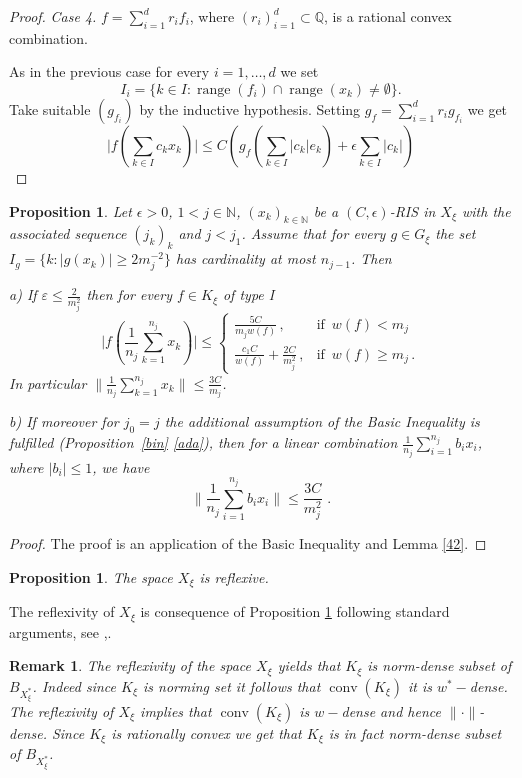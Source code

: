 \documentclass[a4paper]{amsart}
\theoremstyle{plain}
\newtheorem{proposition}[theorem]{Proposition}
\newtheorem{remark}[theorem]{Remark}
\newcommand{\N}{\mathbb{N}}
\newcommand{\Q}{\mathbb{Q}}
\newcommand{\e}{\epsilon}
\newcommand{\norm}[1][\cdot]{\lVert #1\rVert}
\DeclareMathOperator{\conv}{conv}
\DeclareMathOperator{\ran}{range}
\begin{document}
\begin{proof}
\textit{Case 4.} $f=\sum_{i=1}^dr_{i}f_{i}$, where $(r_{i})_{i=1}^d\subset\Q$, is a
rational convex combination.

As in the previous case for every $i=1,\dots,d$ we set
$$I_{i}=\{k\in I: \ran(f_{i})\cap\ran(x_k)\ne\emptyset\}.
$$
Take suitable $(g_{f_i})$ by the inductive hypothesis. Setting $g_{f}=\sum_{i=1}^{d}r_{i}g_{f_i}$ we get
$$
\vert f(\sum_{k\in I}c_{k}x_{k})\vert \leq  C(g_{f}(\sum_{k\in I}\vert c_{k}\vert e_{k})+\e\sum_{k\in I}\vert c_k\vert)
$$
\end{proof}
\begin{proposition}\label{ris}
Let $\e>0$, $1<j\in\N$, $(x_{k})_{k\in\N}$ be a $(C,\e)$-RIS in  $X_{\xi}$  with the associated sequence $(j_{k})_{k}$ and  $j<j_{1}$.
 Assume that for   every $g\in G_{\xi}$ the set
$I_{g}=\{k:\vert g(x_k)\vert\geq 2m_{j}^{-2}\}$
has cardinality at most $n_{j-1}$.
Then

a) If $\varepsilon\leq\frac{2}{m_{j}^{2}}$ then for every $f\in K_{\xi}$ of type I
$$
\vert f(\frac{1}{n_{j}}\sum_{k=1}^{n_{j}}x_{k})\vert \leq
\begin{cases}
\frac{5C}{m_{j}w(f)}\,,\quad &\text{if}\,\,\, w(f)<m_{j}\\
\frac{c_{1}C}{w(f)}+\frac{2C}{m^2_{j}}\,,&\text{if}\,\,\, w(f)\geq
m_{j}\,.
\end{cases}
$$
In particular
$\|\frac{1}{n_{j}}\sum\limits_{k=1}^{n_{j}}x_{k}\|
\leq\frac{3C}{m_{j}}$.

b) If  moreover for $j_{0}=j$ the additional assumption  of the
Basic Inequality is fulfilled (Proposition~\ref{bin} \eqref{ada}), then for a linear
combination $\frac{1}{n_{j}}\sum_{i=1}^{n_{j}}b_{i}x_{i}$, where $\vert b_{i}\vert\leq
1$, we have
$$
\|\frac{1}{n_{j}}\sum_{i=1}^{n_{j}}b_{i}x_{i}\|
\leq\frac{3C}{m_{j}^{2}}\,\,.
$$
\end{proposition}
\begin{proof}
The proof is an application of the Basic Inequality and Lemma
\ref{42}.
\end{proof}
\begin{proposition}
The space  $X_{\xi}$ is reflexive.
\end{proposition}
The reflexivity of $X_{\xi}$ is consequence of  Proposition \ref{ris} following standard arguments, see \cite{AAT},\cite{AT}.
\begin{remark}\label{denseK}
The reflexivity of the space $X_{\xi}$ yields that  $K_{\xi}$ is norm-dense subset of $B_{X_{\xi}^{*}}$.  Indeed since  $K_{\xi}$ is norming set   it follows that  $\conv(K_{\xi})$ it is $w^{*}-$dense.  The reflexivity of $X_{\xi}$ implies that $\conv(K_{\xi})$  is $w-$dense and hence $\norm$-dense. Since $K_{\xi}$ is rationally convex we get that $K_{\xi}$ is in fact norm-dense subset of $B_{X_{\xi}^{*}}$.
\end{remark}
\end{document}
